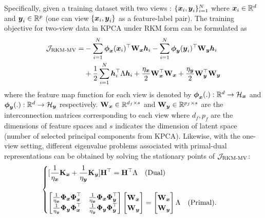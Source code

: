Specifically, given a training dataset with two views : $\{\boldsymbol{x}_i,\boldsymbol{y}_i\}_{i=1}^{N}$ where $\boldsymbol{x}_i \in \mathbb{R}^d$ and $\boldsymbol{y}_i\in \mathbb{R}^p$ (one can view $\{\boldsymbol{x}_i,\boldsymbol{y}_i\}$ as a feature-label pair). The training objective for two-view data in KPCA under RKM form can be formulated as
\begin{equation}
    \begin{aligned}
    \mathcal{J}_{\text{RKM-MV}} = &- \sum_{i=1}^{N} \boldsymbol{\phi}_{\boldsymbol{x}}(\boldsymbol{x}_i)^\top \mathbf{W}_{\boldsymbol{x}} \boldsymbol{h}_i 
    - \sum_{i=1}^{N} \boldsymbol{\phi}_{\boldsymbol{y}}(\boldsymbol{y}_i)^\top \mathbf{W}_{\boldsymbol{y}} \boldsymbol{h}_i \\
    &+ \frac{1}{2} \sum_{i=1}^{N} \boldsymbol{h}_i^\top \Lambda \boldsymbol{h}_i 
    + \frac{\eta_{\boldsymbol{x}}}{2} \mathbf{W}_{\boldsymbol{x}}^{\top} \mathbf{W}_{\boldsymbol{x}} 
    + \frac{\eta_{\boldsymbol{y}}}{2} \mathbf{W}_{\boldsymbol{y}}^{\top} \mathbf{W}_{\boldsymbol{y}}
    \end{aligned}
\end{equation}
where the feature map function for each view is denoted by $\boldsymbol{\phi}_{\boldsymbol{x}}(.): \mathbb{R}^d\to \mathcal{H}_{\boldsymbol{x}}$ and $\boldsymbol{\phi}_{\boldsymbol{y}}(.): \mathbb{R}^d\to \mathcal{H}_{\boldsymbol{y}}$
respectively. $\mathbf{W}_{\boldsymbol{x}}\in \mathbb{R}^{d_f \times s}$ and $\mathbf{W}_{\boldsymbol{y}} \in \mathbb{R}^{p_f\times s}$ are the interconnection matrices corresponding to each view where $d_f, p_f$ are the dimensions of feature spaces and $s$ indicates the dimension of latent space (number of selected principal components from KPCA). Likewise, with the one-view setting, different eigenvalue problems associated with primal-dual representations can be obtained by solving the stationary points of $\mathcal{J}_{\text{RKM-MV}}$: 
\begin{equation}
    \begin{cases}
        \displaystyle
        [\frac{1}{\eta_{\boldsymbol{x}}}\mathbf{K}_{\boldsymbol{x}} + \frac{1}{\eta_{\boldsymbol{y}}}\mathbf{K}_{\boldsymbol{y}}]\mathbf{H}^\top = \mathbf{H}^\top\Lambda \quad \text{(Dual)} \\
        \\
        \begin{bmatrix}
        \frac{1}{\eta_{\boldsymbol{x}}} \boldsymbol{\Phi}_{\boldsymbol{x}} \boldsymbol{\Phi}_{\boldsymbol{x}}^\top & \frac{1}{\eta_{\boldsymbol{x}}} \boldsymbol{\Phi}_{\boldsymbol{x}} \boldsymbol{\Phi}_{\boldsymbol{y}}^\top \\
        \frac{1}{\eta_{\boldsymbol{y}}} \boldsymbol{\Phi}_{\boldsymbol{y}} \boldsymbol{\Phi}_{\boldsymbol{x}}^\top & \frac{1}{\eta_{\boldsymbol{y}}} \boldsymbol{\Phi}_{\boldsymbol{y}} \boldsymbol{\Phi}_{\boldsymbol{y}}^\top
        \end{bmatrix}
        \begin{bmatrix}
        \mathbf{W}_{\boldsymbol{x}} \\
        \mathbf{W}_{\boldsymbol{y}}
        \end{bmatrix}
        =
        \begin{bmatrix}
        \mathbf{W}_{\boldsymbol{x}} \\
        \mathbf{W}_{\boldsymbol{y}}
        \end{bmatrix}
        \Lambda \quad \text{(Primal)}.   
    \end{cases}
\end{equation}
